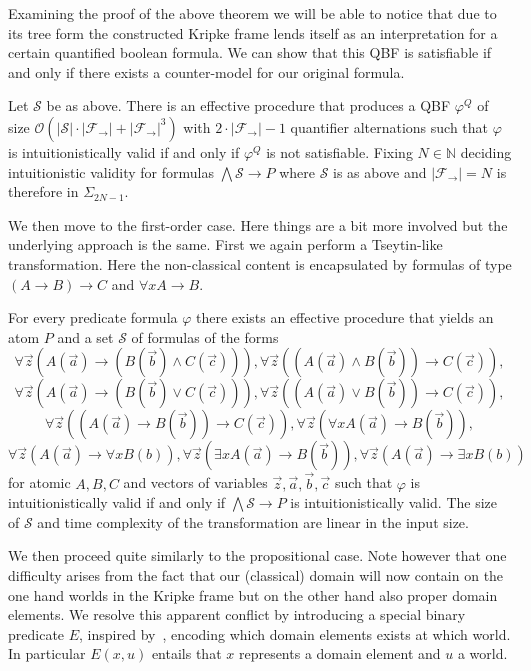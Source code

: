 \documentclass[a4paper,UKenglish,cleveref, autoref, thm-restate]{lipics-v2021}
\begin{document}
Examining the proof of the above theorem we will be able to notice that due to its tree form the constructed Kripke frame lends itself as an interpretation for a certain quantified boolean formula. We can show that this QBF is satisfiable if and only if there exists a counter-model for our original formula.

\begin{theorem}
	Let $\mathcal S$ be as above. There is an effective procedure that produces a QBF $\varphi^Q$ of size $\mathcal O(|\mathcal S|\cdot|\mathcal F_\to| + |\mathcal F_\to|^3)$ with $2\cdot |\mathcal F_\to|-1$ quantifier alternations such that $\varphi$ is intuitionistically valid if and only if $\varphi^Q$ is not satisfiable. Fixing $N\in\mathbb N$ deciding intuitionistic validity for formulas $\bigwedge \mathcal S\to P$ where $\mathcal S$ is as above and $|\mathcal F_\to| = N$ is therefore in $\Sigma_{2N-1}$.
\end{theorem}

We then move to the first-order case. Here things are a bit more involved but the underlying approach is the same. First we again perform a Tseytin-like transformation. Here the non-classical content is encapsulated by formulas of type $(A\to B)\to C$ and $\forall xA\to B$.

\begin{theorem}
	For every predicate formula $\varphi$ there exists an effective procedure that yields an atom $P$ and a set $\mathcal S$ of formulas of the forms
	$$\forall \vec z(A(\vec a)\to (B(\vec b)\wedge C(\vec c))), \forall \vec z((A(\vec a)\wedge B(\vec b))\to C(\vec c)),$$$$\forall \vec z(A(\vec a)\to (B(\vec b)\vee C(\vec c))),
	\forall \vec z((A(\vec a)\vee B(\vec b))\to C(\vec c)),$$$$ \forall \vec z((A(\vec a)\to B(\vec b))\to C(\vec c)),\forall \vec z(\forall xA(\vec a)\to B(\vec b)),$$$$ \forall \vec z(A(\vec a)\to\forall xB(b)), \forall \vec z(\exists xA(\vec a)\to B(\vec b)), \forall \vec z(A(\vec a)\to\exists xB(b))$$for atomic $A, B, C$ and vectors of variables $\vec z, \vec a, \vec b, \vec c$ such that $\varphi$ is intuitionistically valid if and only if $\bigwedge\mathcal S\to P$ is intuitionistically valid. The size of $\mathcal S$ and time complexity of the transformation are linear in the input size.
\end{theorem}

We then proceed quite similarly to the propositional case. Note however that one difficulty arises from the fact that our (classical) domain will now contain on the one hand worlds in the Kripke frame but on the other hand also proper domain elements. We resolve this apparent conflict by introducing a special binary predicate $E$, inspired by~\cite{iemhoff2010eskolemization}, encoding which domain elements exists at which world. In particular $E(x, u)$ entails that $x$ represents a domain element and $u$ a world.
\end{document}
